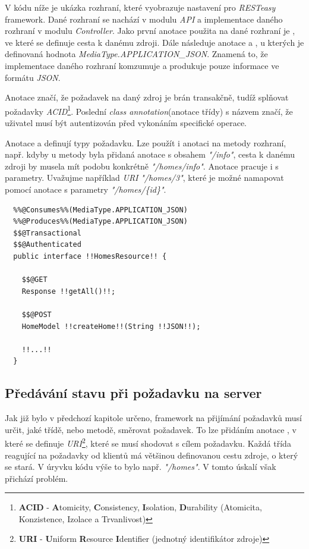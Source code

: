 V kódu níže je ukázka rozhraní, které vyobrazuje nastavení pro \emph{RESTeasy} framework.
Dané rozhraní se nachází v modulu \emph{API} a implementace daného rozhraní v modulu \emph{Controller}.
Jako první anotace použita na dané rozhraní je , ve které se definuje cesta k danému zdroji.
Dále následuje anotace  a , u kterých je definovaná hodnota \emph{MediaType.APPLICATION\_JSON}.
Znamená to, že implementace daného rozhraní komzumuje a produkuje pouze informace ve formátu \emph{JSON}.

Anotace  značí, že požadavek na daný zdroj je brán transakčně, tudíž splňovat požadavky \emph{ACID}\footnote{\textbf{ACID} - \textbf{A}tomicity, \textbf{C}onsistency, \textbf{I}solation, \textbf{D}urability (Atomicita, Konzistence, Izolace a Trvanlivost)}.
Poslední \emph{class annotation}(anotace třídy) s názvem  značí, že uživatel musí být autentizován před vykonáním specifické operace.

Anotace  a  definují typy požadavku.
Lze použít i anotaci  na metody rozhraní, např. kdyby u metody byla přidaná anotace  s obsahem \emph{"/info"}, cesta k danému zdroji
by musela mít podobu konkrétně \emph{"/homes/info"}.
Anotace  pracuje i s parametry.
Uvažujme například \emph{URI} \emph{"/homes/3"}, které je možné namapovat pomocí anotace  s parametry \emph{"/homes/\{id\}"}.

\begin{lstlisting}[style=JavaStyle, caption={Ukázka deklarování rozhraní pro správu domácností}]
  %%@Path%%("/homes")
  %%@Consumes%%(MediaType.APPLICATION_JSON)
  %%@Produces%%(MediaType.APPLICATION_JSON)
  $$@Transactional
  $$@Authenticated
  public interface !!HomesResource!! {

    $$@GET
    Response !!getAll()!!;

    $$@POST
    HomeModel !!createHome!!(String !!JSON!!);

    !!...!!
  }
\end{lstlisting}

\newpage
\subsection*{Předávání stavu při požadavku na server}
\label{impl:backend:state}

Jak již bylo v předchozí kapitole určeno, framework na přijímání požadavků musí určit, jaké třídě, nebo metodě, směrovat požadavek.
To lze přidáním anotace , v které se definuje \emph{URI}\footnote{\textbf{URI} - \textbf{U}niform \textbf{R}esource \textbf{I}dentifier (jednotný identifikátor zdroje)}, které se musí shodovat s cílem požadavku.
Každá třída reagující na požadavky od klientů má většinou definovanou cestu zdroje, o který se stará.
V úryvku kódu výše to bylo např. \emph{"/homes"}.
V tomto úskalí však přichází problém.

